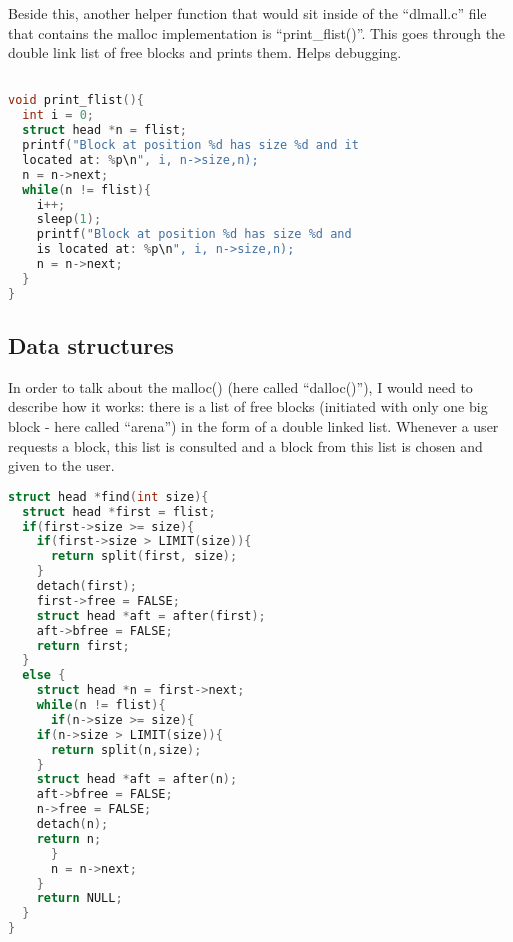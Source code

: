 \documentclass[a4paper,10pt]{article}
\begin{document}
Beside this, another helper function that would sit inside of the ``dlmall.c'' file that contains the malloc implementation is ``print\_flist()''. This goes through the double link list of free blocks and prints them. Helps debugging.
\begin{lstlisting}[language=C]

void print_flist(){
  int i = 0;
  struct head *n = flist;
  printf("Block at position %d has size %d and it
  located at: %p\n", i, n->size,n);
  n = n->next;
  while(n != flist){
    i++;
    sleep(1);
    printf("Block at position %d has size %d and
    is located at: %p\n", i, n->size,n);
    n = n->next;
  }
}

\end{lstlisting}
\vspace{5mm}
\subsection*{Data structures}
In order to talk about the malloc() (here called ``dalloc()''), I would need to describe how it works: there is a list of free blocks (initiated with only one big block - here called ``arena'') in the form of a double linked list. Whenever a user requests a block, this list is consulted and a block from this list is chosen and given to the user.
\begin{lstlisting}[language=C]
struct head *find(int size){
  struct head *first = flist;
  if(first->size >= size){
    if(first->size > LIMIT(size)){
      return split(first, size);
    }
    detach(first);
    first->free = FALSE;
    struct head *aft = after(first);
    aft->bfree = FALSE;
    return first;
  }
  else {
    struct head *n = first->next;
    while(n != flist){
      if(n->size >= size){
	if(n->size > LIMIT(size)){
	  return split(n,size);
	}
	struct head *aft = after(n);
	aft->bfree = FALSE;
	n->free = FALSE;
	detach(n);
	return n;
      }
      n = n->next;
    }
    return NULL;
  }
}
\end{lstlisting}
\vspace{5mm}
\end{document}
